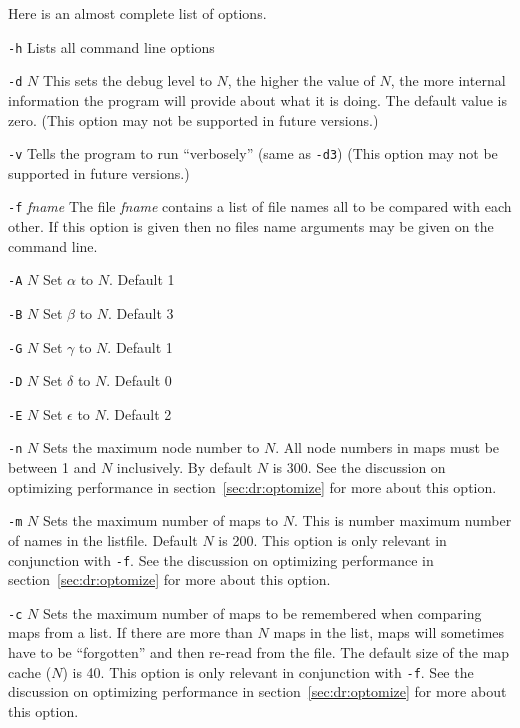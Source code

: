 \documentclass[%
	11pt,
        a4paper,
        twoside]{workrep}
\newlength{\lentrylen}
\newcommand{\lentrylabel}[1]{%
   \settowidth{\lentrylen}{#1}%
   \ifthenelse{\lengthtest{\lentrylen > \labelwidth}}%
      {\parbox[b]{\labelwidth}{\makebox[0pt][l]{#1}\\}}%
      {#1}%
   \hfil\relax}
\newenvironment{optlist}[1][35pt]
    {\renewcommand{\entrylabel}{\lentrylabel}\begin{entry}[#1]}
    {\end{entry}}
\newenvironment{entry}[1][35pt]
  {\begin{list}{}%
    {\renewcommand{\makelabel}{\entrylabel}%
      \setlength{\labelwidth}{#1}%
      \setlength{\leftmargin}{\labelwidth}%
      \addtolength{\leftmargin}{\labelsep}}}
  {\end{list}}
\newcommand{\entrylabel}[1]{\mbox{\textsf{#1:}}\hfil}
\begin{document}
Here is an almost complete list of options.
\begin{optlist}
\item[\texttt{-h}]
        Lists all command line options

\item[\texttt{-d} $N$]
 	This sets the debug level to $N$, the higher the value
	of $N$, the more internal information the program will
	provide about what it is doing.  The default value is
	zero.  (This option may not be supported in future
	versions.)

\item[\texttt{-v}]
	Tells the program to run ``verbosely'' (same as \verb|-d3|)
        (This option may not be supported in future versions.)
  
\item[\texttt{-f} \textit{fname}]
	The file \textit{fname} contains a list of file names all to
	be compared with each other.  If this option is given
	then no files name arguments may be given on the command
	line.

\item[\texttt{-A} $N$]
	Set $\alpha$ to $N$.  Default 1

\item[\texttt{-B} $N$]
	Set $\beta$ to $N$.  Default 3

\item[\texttt{-G} $N$]
	Set $\gamma$ to $N$.  Default 1

\item[\texttt{-D} $N$]
	Set $\delta$ to $N$.  Default 0

\item[\texttt{-E} $N$]
	Set $\epsilon$ to $N$.  Default 2

\item[\texttt{-n} $N$]
	Sets the maximum node number to $N$.  All node numbers
	in maps must be between 1 and $N$ inclusively.  By
	default $N$ is 300.
	See the discussion on optimizing performance
	in section~\ref{sec:dr:optomize}
        for more about this option.

\item[\texttt{-m} $N$]
	Sets the maximum number of maps to $N$.  This is number
	maximum number of names in the listfile.
	Default $N$ is 200.
	This option is only relevant in conjunction with \texttt{-f}.
	See the discussion on optimizing performance
	in section~\ref{sec:dr:optomize}
        for more about this option.

\item[\texttt{-c} $N$]
	Sets the maximum number of maps to be remembered
	when comparing maps from a list.  If there are more
	than $N$ maps in the list, maps will sometimes have
	to be ``forgotten'' and then re-read from the file.
	The default size of the map cache ($N$) is 40.
	This option is only relevant in conjunction with \texttt{-f}.
	See the discussion on optimizing performance
	in section~\ref{sec:dr:optomize}
        for more about this option.


\end{optlist}
\end{document}
